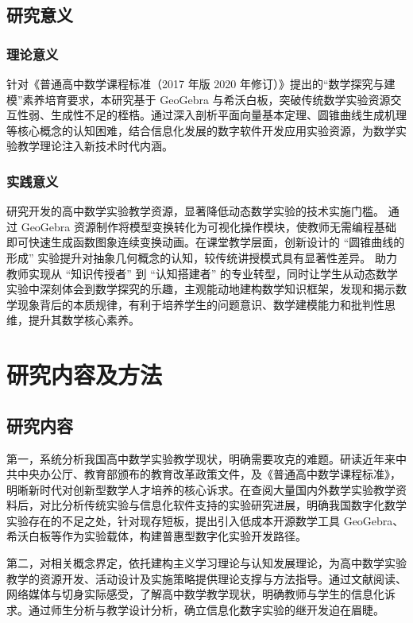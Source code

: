 \subsection{研究意义}

\subsubsection{理论意义}

针对《普通高中数学课程标准（2017 年版 2020 年修订）》提出的“数学探究与建模”素养培育要求，本研究基于 GeoGebra 与希沃白板，突破传统数学实验资源交互性弱、生成性不足的桎梏。通过深入剖析平面向量基本定理、圆锥曲线生成机理等核心概念的认知困难，结合信息化发展的数字软件开发应用实验资源，为数学实验教学理论注入新技术时代内涵。

\subsubsection{实践意义}

研究开发的高中数学实验教学资源，显著降低动态数学实验的技术实施门槛。 通过 GeoGebra 资源制作将模型变换转化为可视化操作模块，使教师无需编程基础即可快速生成函数图象连续变换动画。在课堂教学层面，创新设计的 “圆锥曲线的形成” 实验提升对抽象几何概念的认知，较传统讲授模式具有显著性差异。 助力教师实现从 “知识传授者” 到 “认知搭建者” 的专业转型，同时让学生从动态数学实验中深刻体会到数学探究的乐趣，主观能动地建构数学知识框架，发现和揭示数学现象背后的本质规律，有利于培养学生的问题意识、数学建模能力和批判性思维，提升其数学核心素养。

\section{研究内容及方法}

\subsection{研究内容}

第一，系统分析我国高中数学实验教学现状，明确需要攻克的难题。研读近年来中共中央办公厅、教育部颁布的教育改革政策文件，及《普通高中数学课程标准》，明晰新时代对创新型数学人才培养的核心诉求。在查阅大量国内外数学实验教学资料后，对比分析传统实验与信息化软件支持的实验研究进展，明确我国数字化数学实验存在的不足之处，针对现存短板，提出引入低成本开源数学工具 GeoGebra、希沃白板等作为实验载体，构建普惠型数字化实验开发路径。

第二，对相关概念界定，依托建构主义学习理论与认知发展理论，为高中数学实验教学的资源开发、活动设计及实施策略提供理论支撑与方法指导。通过文献阅读、网络媒体与切身实际感受，了解高中数学教学现状，明确教师与学生的信息化诉求。通过师生分析与教学设计分析，确立信息化数字实验的继开发迫在眉睫。

